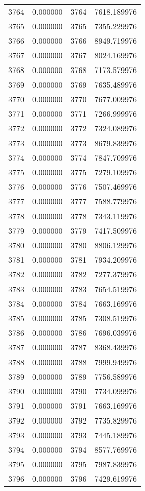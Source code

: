 \documentclass[12pt]{article}
\begin{document}
\begin{longtable}{@{}cccc@{}}
3764 & 0.000000 & 3764 & 7618.189976 \\
3765 & 0.000000 & 3765 & 7355.229976 \\
3766 & 0.000000 & 3766 & 8949.719976 \\
3767 & 0.000000 & 3767 & 8024.169976 \\
3768 & 0.000000 & 3768 & 7173.579976 \\
3769 & 0.000000 & 3769 & 7635.489976 \\
3770 & 0.000000 & 3770 & 7677.009976 \\
3771 & 0.000000 & 3771 & 7266.999976 \\
3772 & 0.000000 & 3772 & 7324.089976 \\
3773 & 0.000000 & 3773 & 8679.839976 \\
3774 & 0.000000 & 3774 & 7847.709976 \\
3775 & 0.000000 & 3775 & 7279.109976 \\
3776 & 0.000000 & 3776 & 7507.469976 \\
3777 & 0.000000 & 3777 & 7588.779976 \\
3778 & 0.000000 & 3778 & 7343.119976 \\
3779 & 0.000000 & 3779 & 7417.509976 \\
3780 & 0.000000 & 3780 & 8806.129976 \\
3781 & 0.000000 & 3781 & 7934.209976 \\
3782 & 0.000000 & 3782 & 7277.379976 \\
3783 & 0.000000 & 3783 & 7654.519976 \\
3784 & 0.000000 & 3784 & 7663.169976 \\
3785 & 0.000000 & 3785 & 7308.519976 \\
3786 & 0.000000 & 3786 & 7696.039976 \\
3787 & 0.000000 & 3787 & 8368.439976 \\
3788 & 0.000000 & 3788 & 7999.949976 \\
3789 & 0.000000 & 3789 & 7756.589976 \\
3790 & 0.000000 & 3790 & 7734.099976 \\
3791 & 0.000000 & 3791 & 7663.169976 \\
3792 & 0.000000 & 3792 & 7735.829976 \\
3793 & 0.000000 & 3793 & 7445.189976 \\
3794 & 0.000000 & 3794 & 8577.769976 \\
3795 & 0.000000 & 3795 & 7987.839976 \\
3796 & 0.000000 & 3796 & 7429.619976 \\

\end{longtable}
\end{document}
